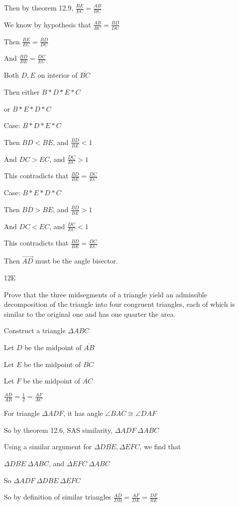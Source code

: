 \documentclass[11pt]{article}
\newcommand{\ray}[1]{\overrightarrow{#1}}
\newcommand{\segment}[1]{\overline{#1}}
\begin{document}
\begin{itemize}
		Then by theorem 12.9, $\frac{BE}{EC} = \frac{AB}{BC}$

		We know by hypothesis that $\frac{AB}{BC} = \frac{BD}{DC}$

		Then $\frac{BE}{EC} = \frac{BD}{DC}$

		And $\frac{BD}{BE} = \frac{DC}{EC}$

		Both $D,E$ on interior of $\segment{BC}$

		Then either $B * D * E* C$

		or $B * E * D * C$

		Case: $B * D * E * C$

		Then $BD < BE$, and $\frac{BD}{BE} < 1$

		And $DC > EC$, and $\frac{DC}{EC} > 1$

		This contradicts that $\frac{BD}{BE} = \frac{DC}{EC}$

		Case: $B * E * D * C$

		Then $BD > BE$, and $\frac{BD}{BE} > 1$

		And $DC < EC$, and $\frac{DC}{EC} < 1$

		This contradicts that $\frac{BD}{BE} = \frac{DC}{EC}$

		Then $\ray{AD}$ must be the angle bisector.

	\item[12E]

		Prove that the three midsegments of a triangle yield an admissible decomposition of the triangle into four congruent triangles, each of which is similar to the original one and has one quarter the area.

		Construct a triangle $\Delta ABC$

		Let $D$ be the midpoint of $\segment{AB}$

		Let $E$ be the midpoint of $\segment{BC}$

		Let $F$ be the midpoint of $\segment{AC}$

		$\frac{AD}{AB} = \frac{1}{2} = \frac{AF}{AC}$

		For triangle $\Delta ADF$, it has angle $\angle BAC \cong \angle DAF$

		So by theorem 12.6, SAS similarity, $\Delta ADF ~ \Delta ABC$

		Using a similar argument for $\Delta DBE, \Delta EFC$, we find that

		$\Delta DBE ~ \Delta ABC$, and $\Delta EFC ~ \Delta ABC$

		So $\Delta ADF ~ \Delta DBE ~ \Delta EFC$

		So by definition of similar triangles $\frac{AD}{DB} = \frac{AF}{DE} = \frac{DF}{BE}$


\end{itemize}
\end{document}
